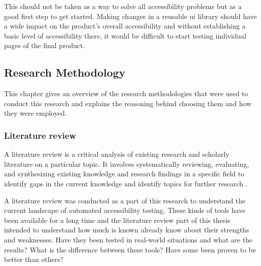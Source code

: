 \documentclass{master_thesis}
\begin{document}
This should not be taken as a way to solve all accessibility problems but as a good first step to get started. Making changes in a reusable \ac{ui} library should have a wide impact on the product's overall accessibility and without establishing a basic level of accessibility there, it would be difficult to start testing individual pages of the final product.

\subsection{Research Methodology}


This chapter gives an overview of the research methodologies that were used to conduct this research and explains the reasoning behind choosing them and how they were employed.



\subsubsection{Literature review}

A literature review is a critical analysis of existing research and scholarly literature on a particular topic. It involves systematically reviewing, evaluating, and synthesizing existing knowledge and research findings in a specific field to identify gaps in the current knowledge and identify topics for further research \citep{Luft2022}.

A literature review was conducted as a part of this research to understand the current landscape of automated accessibility testing. These kinds of tools have been available for a long time and the literature review part of this thesis intended to understand how much is known already know about their strengths and weaknesses. Have they been tested in real-world situations and what are the results? What is the difference between these tools? Have some been proven to be better than others?
\end{document}
